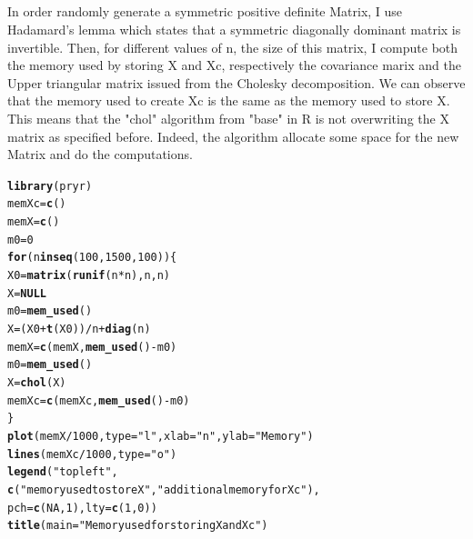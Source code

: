 \documentclass{llncs}\usepackage[]{graphicx}\usepackage[]{color}
\makeatletter
\newcommand{\hlnum}[1]{\textcolor[rgb]{0.686,0.059,0.569}{#1}}%
\newcommand{\hlstr}[1]{\textcolor[rgb]{0.192,0.494,0.8}{#1}}%
\newcommand{\hlopt}[1]{\textcolor[rgb]{0,0,0}{#1}}%
\newcommand{\hlstd}[1]{\textcolor[rgb]{0.345,0.345,0.345}{#1}}%
\newcommand{\hlkwa}[1]{\textcolor[rgb]{0.161,0.373,0.58}{\textbf{#1}}}%
\newcommand{\hlkwb}[1]{\textcolor[rgb]{0.69,0.353,0.396}{#1}}%
\newcommand{\hlkwc}[1]{\textcolor[rgb]{0.333,0.667,0.333}{#1}}%
\newcommand{\hlkwd}[1]{\textcolor[rgb]{0.737,0.353,0.396}{\textbf{#1}}}%
\newenvironment{kframe}{%
 \def\at@end@of@kframe{}%
 \ifinner\ifhmode%
  \def\at@end@of@kframe{\end{minipage}}%
  \begin{minipage}{\columnwidth}%
 \fi\fi%
 \def\FrameCommand##1{\hskip\@totalleftmargin \hskip-\fboxsep
 \colorbox{shadecolor}{##1}\hskip-\fboxsep
     \hskip-\linewidth \hskip-\@totalleftmargin \hskip\columnwidth}%
 \MakeFramed {\advance\hsize-\width
   \@totalleftmargin\z@ \linewidth\hsize
   \@setminipage}}%
 {\par\unskip\endMakeFramed%
 \at@end@of@kframe}
\newenvironment{knitrout}{}{} %
\makeatother
\begin{document}
\subsection{}
In order randomly generate a symmetric positive definite Matrix, I use Hadamard's lemma which states that a symmetric diagonally dominant matrix is invertible. Then, for different values of n, the size of this matrix, I compute both the memory used by storing X and Xc, respectively the covariance marix and the Upper triangular matrix issued from the Cholesky decomposition. We can observe that the memory used to create Xc is the same as the memory used to store X. This means that the "chol" algorithm from "base" in R is not overwriting the X matrix as specified before. Indeed, the algorithm allocate some space for the new Matrix and do the computations.
\begin{knitrout}
\color{fgcolor}\begin{kframe}
\begin{alltt}
\hlkwd{library}\hlstd{(pryr)}
\hlstd{memXc}\hlkwb{=}\hlkwd{c}\hlstd{()}
\hlstd{memX}\hlkwb{=}\hlkwd{c}\hlstd{()}
\hlstd{m0}\hlkwb{=}\hlnum{0}
\hlkwa{for} \hlstd{(n} \hlkwa{in} \hlkwd{seq}\hlstd{(}\hlnum{100}\hlstd{,}\hlnum{1500}\hlstd{,}\hlnum{100}\hlstd{))\{}
  \hlstd{X0}\hlkwb{=}\hlkwd{matrix}\hlstd{(}\hlkwd{runif}\hlstd{(n}\hlopt{*}\hlstd{n),n,n)}
  \hlstd{X}\hlkwb{=}\hlkwa{NULL}
  \hlstd{m0}\hlkwb{=}\hlkwd{mem_used}\hlstd{()}
  \hlstd{X}\hlkwb{=}\hlstd{(X0}\hlopt{+}\hlkwd{t}\hlstd{(X0))}\hlopt{/}\hlstd{n}\hlopt{+}\hlkwd{diag}\hlstd{(n)}
  \hlstd{memX}\hlkwb{=}\hlkwd{c}\hlstd{(memX,}\hlkwd{mem_used}\hlstd{()}\hlopt{-}\hlstd{m0)}
  \hlstd{m0}\hlkwb{=}\hlkwd{mem_used}\hlstd{()}
  \hlstd{X}\hlkwb{=}\hlkwd{chol}\hlstd{(X)}
  \hlstd{memXc}\hlkwb{=}\hlkwd{c}\hlstd{(memXc,}\hlkwd{mem_used}\hlstd{()}\hlopt{-}\hlstd{m0)}
\hlstd{\}}
\hlkwd{plot}\hlstd{(memX}\hlopt{/}\hlnum{1000}\hlstd{,}\hlkwc{type}\hlstd{=}\hlstr{"l"}\hlstd{,}\hlkwc{xlab}\hlstd{=}\hlstr{"n"}\hlstd{,}\hlkwc{ylab}\hlstd{=}\hlstr{"Memory"}\hlstd{)}
\hlkwd{lines}\hlstd{(memXc}\hlopt{/}\hlnum{1000}\hlstd{,}\hlkwc{type}\hlstd{=}\hlstr{"o"}\hlstd{)}
\hlkwd{legend}\hlstd{(}\hlstr{"topleft"}\hlstd{,}
       \hlkwd{c}\hlstd{(}\hlstr{"memory used to store X"}\hlstd{,}\hlstr{"additional memory for Xc"}\hlstd{),}
       \hlkwc{pch}\hlstd{=}\hlkwd{c}\hlstd{(}\hlnum{NA}\hlstd{,}\hlnum{1}\hlstd{),}\hlkwc{lty}\hlstd{=}\hlkwd{c}\hlstd{(}\hlnum{1}\hlstd{,}\hlnum{0}\hlstd{))}
\hlkwd{title}\hlstd{(}\hlkwc{main} \hlstd{=} \hlstr{"Memory used for storing X and Xc"}\hlstd{)}

\end{alltt}
\end{kframe}
\end{knitrout}
\end{document}
